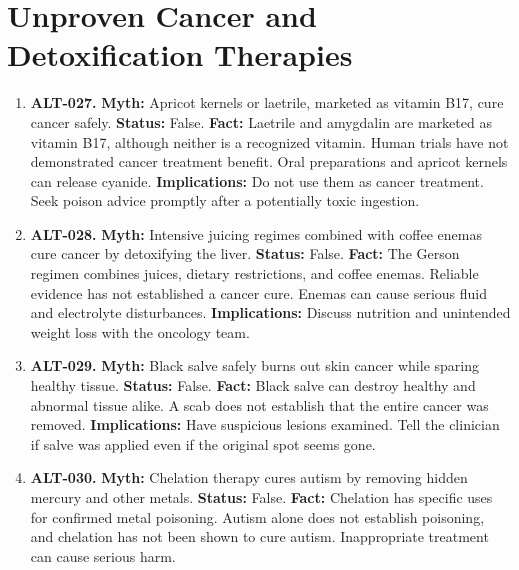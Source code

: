 \documentclass[11pt,oneside]{book}
\begin{document}
\section{Unproven Cancer and Detoxification Therapies}
\begin{enumerate}[leftmargin=0pt,labelwidth=0pt,labelsep=0pt,itemindent=0pt]
\item[] \textbf{ALT-027.} \textbf{Myth:} Apricot kernels or laetrile, marketed as vitamin B17, cure cancer safely.\newline
\textbf{Status:} False.\newline
\textbf{Fact:} Laetrile and amygdalin are marketed as vitamin B17, although neither is a recognized vitamin. Human trials have not demonstrated cancer treatment benefit. Oral preparations and apricot kernels can release cyanide. \cite{ref128,ref474}\newline
\textbf{Implications:} Do not use them as cancer treatment. Seek poison advice promptly after a potentially toxic ingestion.
\item[] \textbf{ALT-028.} \textbf{Myth:} Intensive juicing regimes combined with coffee enemas cure cancer by detoxifying the liver.\newline
\textbf{Status:} False.\newline
\textbf{Fact:} The Gerson regimen combines juices, dietary restrictions, and coffee enemas. Reliable evidence has not established a cancer cure. Enemas can cause serious fluid and electrolyte disturbances. \cite{ref129}\newline
\textbf{Implications:} Discuss nutrition and unintended weight loss with the oncology team.
\item[] \textbf{ALT-029.} \textbf{Myth:} Black salve safely burns out skin cancer while sparing healthy tissue.\newline
\textbf{Status:} False.\newline
\textbf{Fact:} Black salve can destroy healthy and abnormal tissue alike. A scab does not establish that the entire cancer was removed. \cite{ref130}\newline
\textbf{Implications:} Have suspicious lesions examined. Tell the clinician if salve was applied even if the original spot seems gone.
\item[] \textbf{ALT-030.} \textbf{Myth:} Chelation therapy cures autism by removing hidden mercury and other metals.\newline
\textbf{Status:} False.\newline
\textbf{Fact:} Chelation has specific uses for confirmed metal poisoning. Autism alone does not establish poisoning, and chelation has not been shown to cure autism. Inappropriate treatment can cause serious harm. \cite{ref131}\newline

\end{enumerate}
\end{document}
